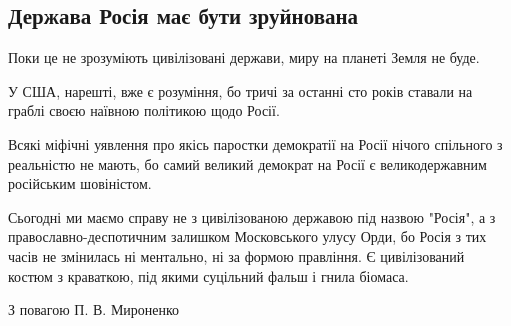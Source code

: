  
 
 
 
 

\subsection{Держава Росія має бути зруйнована}

Поки це не зрозуміють цивілізовані держави, миру на планеті Земля не буде.

У США, нарешті, вже є розуміння, бо тричі за останні сто років ставали на граблі своєю наївною політикою щодо Росії.

Всякі міфічні уявлення про якісь паростки демократії на Росії нічого спільного з реальністю не мають, бо самий великий демократ на Росії є великодержавним російським шовіністом.

Сьогодні ми маємо справу не з цивілізованою державою під назвою "Росія", а з
православно-деспотичним залишком Московського улусу Орди, бо Росія з тих часів
не змінилась ні ментально, ні за формою правління. Є цивілізований костюм з
краваткою, під якими суцільний фальш і гнила біомаса.

З повагою П. В. Мироненко

